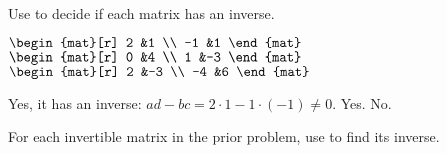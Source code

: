 \begin{exercises}
\begin{answer}
\begin{multline*}
\begin{aligned}
       \end{aligned}
    \end{multline*} 
   \end{answer}
 \recommended \item 
    Use  to decide if each matrix 
    has an inverse.
    \begin{exparts*}
      \partsitem
        $\begin{mat}[r]
           2  &1  \\
          -1  &1          
        \end{mat}$
      \partsitem
        $\begin{mat}[r]
          0  &4  \\
          1  &-3
        \end{mat}$
      \partsitem
        $\begin{mat}[r]
          2  &-3  \\
         -4  &6
        \end{mat}$
    \end{exparts*}
    \begin{answer}
      \begin{exparts*}
        \partsitem Yes, it has an inverse: $ad-bc=2\cdot 1-1\cdot(-1)\neq 0$.
        \partsitem Yes.
        \partsitem No.
      \end{exparts*}
    \end{answer}
  \recommended \item  
     For each invertible matrix in the prior problem, use
      to find its inverse.
     \begin{answer}
\end{answer}
\end{exercises}
